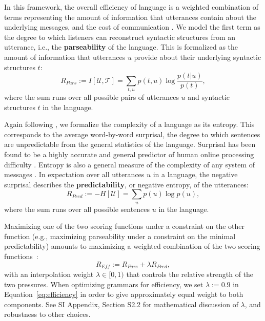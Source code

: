 \documentclass[9pt,twocolumn,twoside,lineno]{pnas-new}
\newcommand{\key}[1]{\textbf{#1}}
\begin{document}
{In this framework, the overall efficiency of language is a weighted combination of terms representing the amount of information that utterances contain about the underlying messages, and the cost of communication  \cite{ferreri2003least,frank2012predicting,kemp2012kinship,regier2015word,zaslavsky2018efficient}. We model the first term as the 
 degree to which listeners can reconstruct syntactic structures from an utterance, i.e., the \key{parseability} of the language.
 This is formalized as the amount of information that utterances $u$ provide about their underlying syntactic structures $t$:
\begin{equation}
	R_{Pars} := I[\mathcal{U},\mathcal{T}] = \sum_{t,u} p(t,u) \log \frac{p(t|u)}{p(t)},
\end{equation}
where the sum runs over all possible pairs of utterances $u$ and syntactic structures $t$ in the language.

Again following \cite{ferreri2003least}, we formalize the complexity of a language as its entropy.
This corresponds to the average word-by-word surprisal, the degree to which sentences are unpredictable from the general statistics of the language.
Surprisal has been found to be a highly accurate and general predictor of human online processing difficulty \cite{hale2001probabilistic,levy2008expectation,smith2013effect}.
Entropy is also a general measure of the complexity of any system of messages \cite{shannon1948mathematical}.
In expectation over all utterances $u$ in a language, the negative surprisal describes the \key{predictability}, or negative entropy, of the utterances:
\begin{equation}
	R_{Pred} := - H[\mathcal{U}] = \sum_{u} p(u) \log p(u),
\end{equation}
where the sum runs over all possible sentences $u$ in the language.

Maximizing one of the two scoring functions under a constraint on the other function (e.g., maximizing parseability under a constraint on the minimal predictability) amounts to maximizing a weighted combination of the two scoring functions~\cite{ferreri2003least}:
\begin{equation}\label{eq:efficiency}
	R_{\textit{Eff}} := R_{\textit{Pars}} + \lambda R_\textit{Pred},
\end{equation}
with an interpolation weight $\lambda \in [0,1)$ that controls the relative strength of the two pressures.
When optimizing grammars for efficiency, we set $\lambda := 0.9$ in Equation~\ref{eq:efficiency} in order to give approximately equal weight to both components.
See SI Appendix, Section S2.2 for mathematical discussion of $\lambda$, and robustness to other choices.

}
\end{document}
